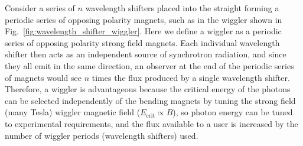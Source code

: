 \documentclass[../main.tex]{subfiles}
\begin{document}
Consider a series of $n$ wavelength shifters placed into the straight forming a periodic series of opposing polarity magnets, such as in the wiggler shown in Fig.~\ref{fig:wavelength_shifter_wiggler}. Here we define a wiggler as a periodic series of opposing polarity strong field magnets. Each individual wavelength shifter then acts as an independent source of synchrotron radiation, and since they all emit in the same direction, an observer at the end of the periodic series of magnets would see $n$ times the flux produced by a single wavelength shifter. Therefore, a wiggler is advantageous because the critical energy of the photons can be selected independently of the bending magnets by tuning the strong field (many Tesla) wiggler magnetic field ($E_{\mathrm{crit}} \propto B$), so photon energy can be tuned to experimental requirements, and the flux available to a user is increased by the number of wiggler periods (wavelength shifters) used.
\end{document}
